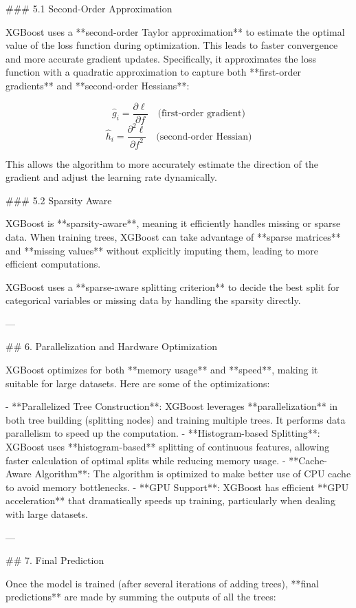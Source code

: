 ### 5.1 Second-Order Approximation

XGBoost uses a **second-order Taylor approximation** to estimate the optimal value of the loss function during optimization. This leads to faster convergence and more accurate gradient updates. Specifically, it approximates the loss function with a quadratic approximation to capture both **first-order gradients** and **second-order Hessians**:

\[
\hat{g}_i = \frac{\partial \ell}{\partial f} \quad \text{(first-order gradient)}
\]
\[
\hat{h}_i = \frac{\partial^2 \ell}{\partial f^2} \quad \text{(second-order Hessian)}
\]

This allows the algorithm to more accurately estimate the direction of the gradient and adjust the learning rate dynamically.

### 5.2 Sparsity Aware

XGBoost is **sparsity-aware**, meaning it efficiently handles missing or sparse data. When training trees, XGBoost can take advantage of **sparse matrices** and **missing values** without explicitly imputing them, leading to more efficient computations.

XGBoost uses a **sparse-aware splitting criterion** to decide the best split for categorical variables or missing data by handling the sparsity directly.

---

## 6. Parallelization and Hardware Optimization

XGBoost optimizes for both **memory usage** and **speed**, making it suitable for large datasets. Here are some of the optimizations:

- **Parallelized Tree Construction**: XGBoost leverages **parallelization** in both tree building (splitting nodes) and training multiple trees. It performs data parallelism to speed up the computation.
- **Histogram-based Splitting**: XGBoost uses **histogram-based** splitting of continuous features, allowing faster calculation of optimal splits while reducing memory usage.
- **Cache-Aware Algorithm**: The algorithm is optimized to make better use of CPU cache to avoid memory bottlenecks.
- **GPU Support**: XGBoost has efficient **GPU acceleration** that dramatically speeds up training, particularly when dealing with large datasets.

---

## 7. Final Prediction

Once the model is trained (after several iterations of adding trees), **final predictions** are made by summing the outputs of all the trees:

